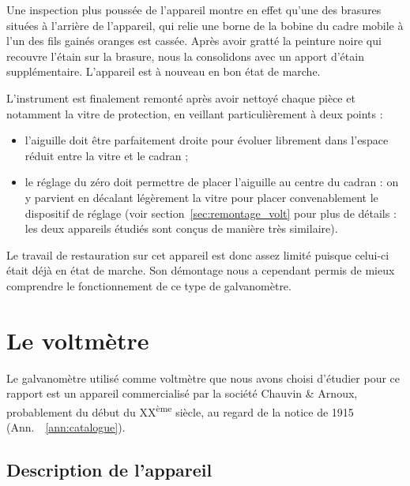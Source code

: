 \documentclass[12pt,a4paper,fleqn]{article}
\begin{document}
Une inspection plus poussée de l'appareil montre en effet qu'une des brasures situées à l'arrière de l'appareil, qui relie une borne de la bobine du cadre mobile à l'un des fils gainés oranges est cassée.
Après avoir gratté la peinture noire qui recouvre l'étain sur la brasure, nous la consolidons avec un apport d'étain supplémentaire.
L'appareil est à nouveau en bon état de marche.

L'instrument est finalement remonté après avoir nettoyé chaque pièce et notamment la vitre de protection, en veillant particulièrement à deux points :
\begin{itemize}
\item l'aiguille doit être parfaitement droite pour évoluer librement dans l'espace réduit entre la vitre et le cadran ;
\item le réglage du zéro doit permettre de placer l'aiguille au centre du cadran : on y parvient en décalant légèrement la vitre pour placer convenablement le dispositif de réglage (voir section~\ref{sec:remontage_volt} pour plus de détails : les deux appareils étudiés sont conçus de manière très similaire).
\end{itemize}
Le travail de restauration sur cet appareil est donc assez limité puisque celui-ci était déjà en état de marche.
Son démontage nous a cependant permis de mieux comprendre le fonctionnement de ce type de galvanomètre.





\section{Le voltmètre}

Le galvanomètre utilisé comme voltmètre que nous avons choisi d'étudier pour ce rapport est un appareil commercialisé par la société Chauvin \& Arnoux, probablement du début du XX\textsuperscript{ème} siècle, au regard de la notice de 1915 (Ann.~~\ref{ann:catalogue}).

\subsection{Description de l'appareil}
\end{document}
